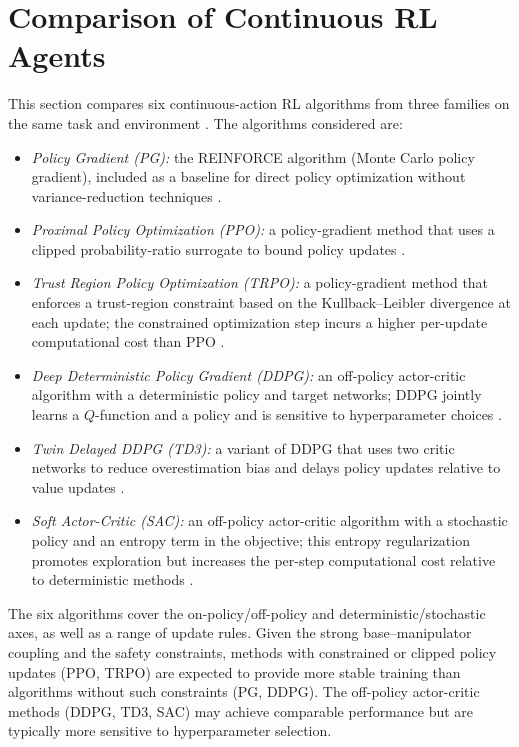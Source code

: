 \documentclass{ieeeaccess}
\begin{document}
\section{Comparison of Continuous RL Agents} \label{comparison}
This section compares six continuous-action RL algorithms from three families on the same task and environment \cite{b2,b7}. The algorithms considered are:

\begin{itemize}
  \item \textit{Policy Gradient (PG):} the REINFORCE algorithm (Monte Carlo policy gradient), included as
a baseline for direct policy optimization without variance-reduction techniques \cite{b7,b21}.
  \item \textit{Proximal Policy Optimization (PPO):} a policy-gradient method that uses a clipped
probability-ratio surrogate to bound policy updates \cite{b15}.
  \item \textit{Trust Region Policy Optimization (TRPO):} a policy-gradient method that enforces a trust-region
constraint based on the Kullback--Leibler divergence at each update; the constrained optimization step incurs a higher per-update computational cost than PPO \cite{b14}.
  \item \textit{Deep Deterministic Policy Gradient (DDPG):} an off-policy actor-critic algorithm with a
deterministic policy and target networks; DDPG jointly learns a $Q$-function and a policy and is sensitive to hyperparameter choices \cite{b16}.
  \item \textit{Twin Delayed DDPG (TD3):} a variant of DDPG that uses two critic networks to reduce overestimation bias and delays policy updates relative to value updates \cite{b17}.
  \item \textit{Soft Actor-Critic (SAC):} an off-policy actor-critic algorithm with a stochastic policy and an entropy term in the objective; this entropy regularization promotes exploration but increases the per-step computational cost relative to deterministic methods \cite{b18}.
\end{itemize}

The six algorithms cover the on-policy/off-policy and deterministic/stochastic axes, as well as a range of update rules. Given the strong base--manipulator coupling and the safety constraints, methods with constrained or clipped policy updates (PPO, TRPO) are expected to provide more stable training than algorithms without such constraints (PG, DDPG). The off-policy actor-critic methods (DDPG, TD3, SAC) may achieve comparable performance but are typically more sensitive to hyperparameter selection.
\end{document}
